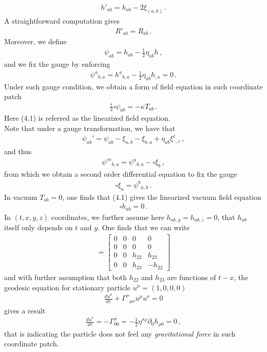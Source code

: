 \documentclass[11pt, onesided]{book}
\theoremstyle{break}
\theoremstyle{break}
\newcommand{\pd}{\partial}
\newcommand{\bmat}[1]{\begin{bmatrix} #1 \end{bmatrix}}
\begin{document}
\begin{align*}
h'_{ab} = h_{ab} - 2\xi_{(a,b)}\,.
\end{align*}
A straightforward computation gives
\begin{align*}
R'_{ab} = R_{ab}\,.
\end{align*}
Moreover, we define
\begin{align*}
\psi_{ab} = h_{ab} - \frac{1}{2}\eta_{ab}h\,,
\end{align*}
and we fix the gauge by enforcing
\begin{align*}
\psi^a{}_{b,a}=h^a{}_{b,a} - \frac{1}{2}\eta_{ab}h_{,a} = 0\,.
\end{align*}
Under such gauge condition, we obtain a form of field equation in such coordinate patch
\begin{align}
\frac{\epsilon}{2}\square \psi_{ab} = -\kappa T_{ab}\,.
\end{align}
Here (4.1) is referred as the linearized field equation.\\

Note that under a gauge transformation, we have that
\begin{align*}
\psi_{ab}' = \psi_{ab} - \xi_{a,b} - \xi_{b,a} + \eta_{ab}\xi^c{}_{,c}\,,
\end{align*}
and thus 
\begin{align*}
{\psi'}^{a}{}_{b,a} = \psi^a{}_{b,a} - \square \xi_b\,,
\end{align*}
from which we obtain a second order differential equation to fix the gauge
\begin{align}
\square \xi_a = \psi^b{}_{a,b}\,.
\end{align}
In vacuum $T_{ab} = 0$, one finds that (4.1) gives the linearized vacuum field equation
\begin{align*}
\square h_{ab} = 0\,.
\end{align*}
In $(t,x,y,z)$ coordinates, we further assume here $h_{ab,y} = h_{ab,z} = 0$, that $h_{ab}$ itself only depends on $t$ and $y$. One finds that we can write
\begin{align*}
[h_{ab}] = \bmat{0 & 0 & 0 & 0\\
0 & 0 & 0 & 0\\
0 & 0 & h_{22} & h_{23}\\
0 & 0 & h_{23} & -h_{22}}
\end{align*}
and with further assumption that both $h_{22}$ and $h_{23}$ are functions of $t-x$, the geodesic equation for stationary particle $u^\mu = (1,0,0,0)$
\begin{align*}
\frac{d u^\sigma}{d\tau} + \Gamma^{\sigma}{}_{\mu\nu}u^\mu u^\nu = 0
\end{align*}
gives a result
\begin{align*}
\frac{du^\sigma}{d\tau} = -\Gamma_{00}^\sigma =-\frac{1}{2}\eta^{\sigma\rho}\pd_0h_{\rho 0} = 0\,,
\end{align*}
that is indicating the particle does not feel any \textit{gravitational force} in such coordinate patch.\\
\end{document}
